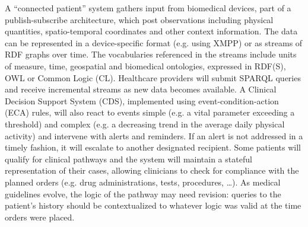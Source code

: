 \documentclass[runningheads]{llncs}
\begin{document}
A ``connected patient'' system gathers input from biomedical devices, part of a publish-subscribe architecture, which post observations including physical quantities, spatio-temporal coordinates and other context information. 
The data can be represented in a device-specific format (e.g. using XMPP\cite{XMPP}) or as streams of RDF graphs over time. 
The vocabularies referenced in the streams include units of measure, time, geospatial and biomedical ontologies, expressed in RDF(S), OWL or Common Logic (CL). 
Healthcare providers will submit SPARQL queries and receive incremental streams as new data becomes available. 
A Clinical Decision Support System (CDS), implemented using event-condition-action (ECA) rules, will also react to events simple (e.g. a vital parameter exceeding a threshold) and complex  (e.g. a decreasing trend in the average daily physical activity) and intervene with alerts and reminders. 
If an alert is not addressed in a timely fashion, it will escalate to another designated recipient. 
Some patients will qualify for clinical pathways and the system will maintain a stateful representation of their cases, allowing clinicians to check for compliance with the planned orders (e.g. drug administrations, tests, procedures, \dots). 
As medical guidelines evolve, the logic of the pathway may need revision: queries to the patient's history should be contextualized to whatever logic was valid at the time orders were placed.
\end{document}
